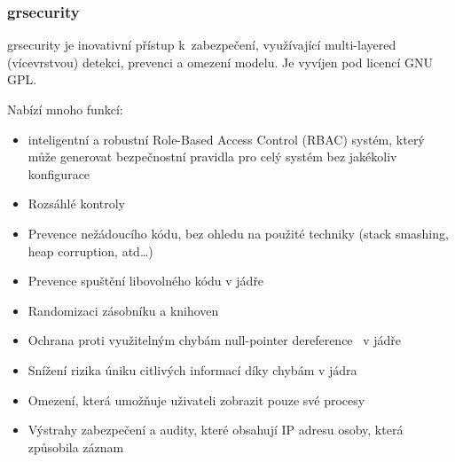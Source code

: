 \documentclass[a4paper,12pt]{article}
\begin{document}
\subsubsection{grsecurity}

grsecurity je inovativní přístup k~zabezpečení, využívající multi-layered (vícevrstvou) detekci, prevenci a omezení modelu. Je vyvíjen pod licencí GNU GPL.~\cite{Grsecurity}

Nabízí mnoho funkcí:
\begin{itemize}
 \item inteligentní a robustní Role-Based Access Control (RBAC) systém, který může generovat bezpečnostní pravidla pro celý systém bez jakékoliv konfigurace
 \item Rozsáhlé kontroly
 \item Prevence nežádoucího kódu, bez ohledu na použité techniky (stack smashing, heap corruption, atd…)
 \item Prevence spuštění libovolného kódu v jádře
 \item Randomizaci zásobníku a knihoven
 \item Ochrana proti využitelným chybám null-pointer dereference~\cite{Null-pointerDereference} v jádře
 \item Snížení rizika úniku citlivých informací díky chybám v jádra
 \item Omezení, která umožňuje uživateli zobrazit pouze své procesy
 \item Výstrahy zabezpečení a audity, které obsahují IP adresu osoby, která způsobila záznam
\end{itemize}


\end{document}
